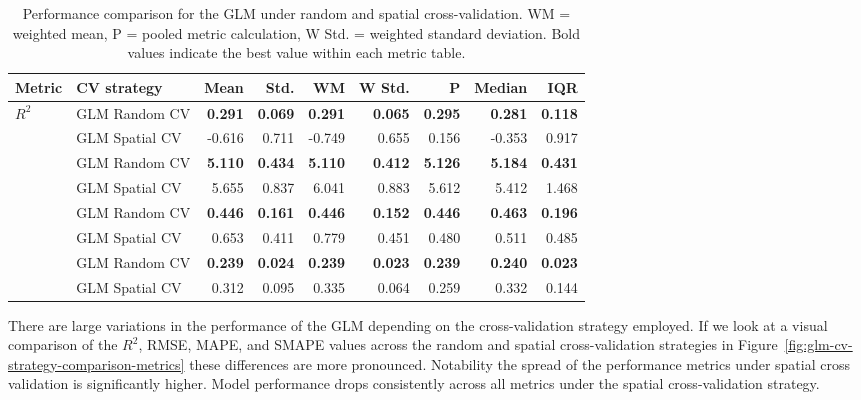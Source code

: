 \begin{table}[ht]
\centering
\small
\caption{Performance comparison for the GLM under random and spatial cross-validation. WM = weighted mean, P = pooled metric calculation, W Std. = weighted standard deviation. Bold values indicate the best value within each metric table.}\label{tab:glm-cv-strategy-comparison}
\begin{tabular}{llrrrrrrr}
\toprule
\textbf{Metric} & \textbf{CV strategy} & \textbf{Mean} & \textbf{Std.} & \textbf{WM} & \textbf{W Std.} & \textbf{P} & \textbf{Median} & \textbf{IQR} \\
\midrule
\multirow{2}{*}{\(R^2\)}
& GLM Random CV & \textbf{0.291} & \textbf{0.069} & \textbf{0.291} & \textbf{0.065} & \textbf{0.295} & \textbf{0.281} & \textbf{0.118} \\
& GLM Spatial CV & -0.616 & 0.711 & -0.749 & 0.655 & 0.156 & -0.353 & 0.917 \\

\addlinespace
\multirow{2}{*}{RMSE}
& GLM Random CV & \textbf{5.110} & \textbf{0.434} & \textbf{5.110} & \textbf{0.412} & \textbf{5.126} & \textbf{5.184} & \textbf{0.431} \\
& GLM Spatial CV & 5.655 & 0.837 & 6.041 & 0.883 & 5.612 & 5.412 & 1.468 \\

\addlinespace
\multirow{2}{*}{MAPE}
& GLM Random CV & \textbf{0.446} & \textbf{0.161} & \textbf{0.446} & \textbf{0.152} & \textbf{0.446} & \textbf{0.463} & \textbf{0.196} \\
& GLM Spatial CV & 0.653 & 0.411 & 0.779 & 0.451 & 0.480 & 0.511 & 0.485 \\

\addlinespace
\multirow{2}{*}{SMAPE}
& GLM Random CV & \textbf{0.239} & \textbf{0.024} & \textbf{0.239} & \textbf{0.023} & \textbf{0.239} & \textbf{0.240} & \textbf{0.023} \\
& GLM Spatial CV & 0.312 & 0.095 & 0.335 & 0.064 & 0.259 & 0.332 & 0.144 \\

\bottomrule
\end{tabular}
\end{table}

There are large variations in the performance of the GLM depending on the cross-validation strategy employed. If we look at a visual comparison of the \(R^2\), RMSE, MAPE, and SMAPE values across the random and spatial cross-validation strategies in Figure~\ref{fig:glm-cv-strategy-comparison-metrics} these differences are more pronounced. Notability the spread of the performance metrics under spatial cross validation is significantly higher. Model performance drops consistently across all metrics under the spatial cross-validation strategy.

